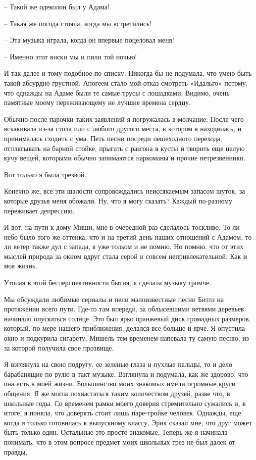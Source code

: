 \documentclass[
]{book}
\begin{document}
-- Такой же одеколон был у Адама!

-- Такая же погода стояла, когда мы встретились!

-- Эта музыка играла, когда он впервые поцеловал меня!

-- Именно этот виски мы и пили той ночью!

И так далее и тому подобное по списку. Никогда бы не подумала, что умею быть такой абсурдно грустной. Апогеем стало мой отказ смотреть «Идальго» потому, что однажды на Адаме были те самые трусы с лошадками. Видимо, очень памятные моему переживающему не лучшие времена сердцу.

Обычно после парочки таких заявлений я погружалась в молчание. После чего вскакивала из-за стола или с любого другого места, в котором я находилась, и принималась сходить с ума. Петь песни посреди пешеходного перехода, отплясывать на барной стойке, прыгать с разгона в кусты и творить еще целую кучу вещей, которыми обычно занимаются наркоманы и прочие нетрезвенники.

Вот только я была трезвой.

Конечно же, все эти шалости сопровождались неиссякаемым запасом шуток, за которые друзья меня обожали. Ну, что я могу сказать? Каждый по-разному переживает депрессию.

И вот, на пути к дому Миши, мне в очередной раз сделалось тоскливо. То ли небо было того же оттенка, что и на третий день наших отношений с Адамом, то ли ветер также дул с запада, я уже толком и не помню. Но помню, что от этих мыслей природа за окном вдруг стала серой и совсем непривлекательной. Как и моя жизнь.

Утопая в этой бесперспективности бытия, я сделала музыку громче.

Мы обсуждали любимые сериалы и пели малоизвестные песни Битлз на протяжении всего пути. Где-то там впереди, за облысевшими ветвями деревьев начинало опускаться солнце. Это был ярко оранжевый диск громадных размеров, который, по мере нашего приближения, делался все больше и ярче. Я опустила окно и подкурила сигарету. Мишель тем временем напевала ту самую песню, из-за которой получила свое прозвище.

Я взглянула на свою подругу, ее зеленые глаза и пухлые пальцы, то и дело барабанящие по рулю в такт музыке. Взглянула и подумала, как же здорово, что она есть в моей жизни. Большинство моих знакомых имели огромные круги общения. Я же могла похвастаться таким количеством друзей, разве что, в школьные годы. Со временем рамки моего доверия стремительно сужались и, в итоге, я поняла, что доверять стоит лишь паре-тройке человек. Однажды, еще когда я только готовилась к выпускному классу, Эрик сказал мне, что друг может быть только один. Остальные это просто знакомые. Теперь же я начинала понимать, что в этом вопросе предмет моих школьных грез не был далек от правды.
\end{document}
